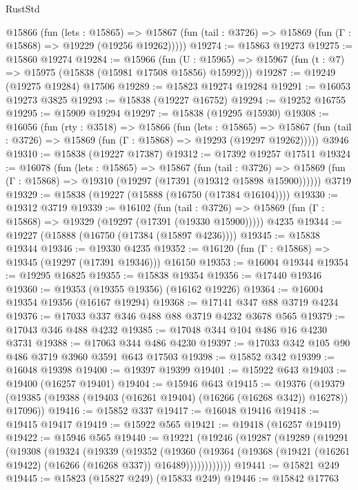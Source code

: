 \begin{lexlean}{RustStd}
\begin{coremodule}
    @15866
      (fun (lets : @15865) =>
      @15867 (fun (tail : @3726) => @15869 (fun (Γ : @15868) => @19229 (@19256 @19262)))))
@19274 := @15863 @19273
@19275 := @15860 @19274
@19284 := @15966
    (fun (U : @15965) => @15967 (fun (t : @7) => @15975 (@15838 (@15981 @17508 @15856) @15992)))
@19287 := @19249 (@19275 @19284) @17506
@19289 := @15823 @19274 @19284
@19291 := @16053 @19273 @3825
@19293 := @15838 (@19227 @16752)
@19294 := @19252 @16755
@19295 := @15909 @19294
@19297 := @15838 (@19295 @15930)
@19308 := @16056
    (fun (rty : @3518) =>
    @15866
      (fun (lets : @15865) =>
      @15867 (fun (tail : @3726) => @15869 (fun (Γ : @15868) => @19293 (@19297 @19262)))))
    @3946
@19310 := @15838 (@19227 @17387)
@19312 := @17392 @19257 @17511
@19324 := @16078
    (fun (lets : @15865) =>
    @15867
      (fun (tail : @3726) =>
      @15869 (fun (Γ : @15868) => @19310 (@19297 (@17391 (@19312 @15898 @15900))))))
    @3719
@19329 := @15838 (@19227 (@15888 (@16750 (@17384 @16104))))
@19330 := @19312 @3719
@19339 := @16102
    (fun (tail : @3726) => @15869 (fun (Γ : @15868) => @19329 (@19297 (@17391 (@19330 @15900)))))
    @4235
@19344 := @19227 (@15888 (@16750 (@17384 (@15897 @4236))))
@19345 := @15838 @19344
@19346 := @19330 @4235
@19352 := @16120 (fun (Γ : @15868) => @19345 (@19297 (@17391 @19346))) @16150
@19353 := @16004 @19344
@19354 := @19295 @16825
@19355 := @15838 @19354
@19356 := @17440 @19346
@19360 := @19353 (@19355 @19356) (@16162 @19226)
@19364 := @16004 @19354 @19356 (@16167 @19294)
@19368 := @17141 @347 @88 @3719 @4234
@19376 := @17033 @337 @346 @488 @88 @3719 @4232 @3678 @565
@19379 := @17043 @346 @488 @4232
@19385 := @17048 @344 @104 @486 @16 @4230 @3731
@19388 := @17063 @344 @486 @4230
@19397 := @17033 @342 @105 @90 @486 @3719 @3960 @3591 @643 @17503
@19398 := @15852 @342
@19399 := @16048 @19398
@19400 := @19397 @19399
@19401 := @15922 @643
@19403 := @19400 (@16257 @19401)
@19404 := @15946 @643
@19415 := @19376
    (@19379 (@19385 (@19388 (@19403 (@16261 @19404) (@16266 (@16268 @342)) @16278)) @17096))
@19416 := @15852 @337
@19417 := @16048 @19416
@19418 := @19415 @19417
@19419 := @15922 @565
@19421 := @19418 (@16257 @19419)
@19422 := @15946 @565
@19440 := @19221
    (@19246
      (@19287
        (@19289
          (@19291
            (@19308
              (@19324
                (@19339
                  (@19352
                    (@19360
                      (@19364
                        (@19368 (@19421 (@16261 @19422) (@16266 (@16268 @337)) @16489))))))))))))
@19441 := @15821 @249
@19445 := @15823 (@15827 @249) (@15833 @249)
@19446 := @15842 @17763

\end{coremodule}
\end{lexlean}
